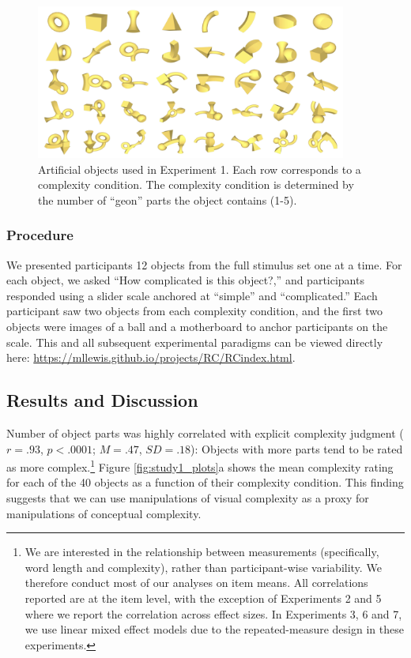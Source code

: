 \documentclass[man]{apa2}
\begin{document}
\begin{figure}
 \begin{center}
  \includegraphics[height=2in]{figures/geon_stimuli.png}
  \caption{\label{fig:geons} Artificial objects used in Experiment 1. Each row corresponds to a complexity condition. The complexity condition is determined by the number of ``geon'' parts the object contains (1-5). }
 \end{center}
\end{figure}

\subsubsection{Procedure}
We presented participants 12 objects from the full stimulus set one at a time. For each object, we asked ``How complicated is this object?,'' and participants responded using a slider scale anchored at ``simple'' and ``complicated.'' Each participant saw two objects from each complexity condition, and the first two objects were images of a ball and a motherboard to anchor participants on the scale. This and all subsequent experimental paradigms can be viewed directly here: \url{https://mllewis.github.io/projects/RC/RCindex.html}.

\subsection{Results and Discussion}
Number of object parts was highly correlated with explicit complexity judgment ($r = .93$, $p < .0001$; $M = .47$, $SD = .18$): Objects with more parts tend to be rated as more complex.\footnote{We are interested in the relationship between measurements (specifically, word length and complexity), rather than participant-wise variability. We therefore conduct most of our analyses on item means. All correlations reported are at the item level, with the exception of Experiments 2 and 5 where we report the correlation across effect sizes. In Experiments 3, 6 and 7, we use linear mixed effect models due to the repeated-measure design in these experiments.} Figure \ref{fig:study1_plots}a shows the mean complexity rating for each of the 40 objects as a function of their complexity condition. This finding suggests that we can use manipulations of visual complexity as a proxy for manipulations of conceptual complexity.
\end{document}
